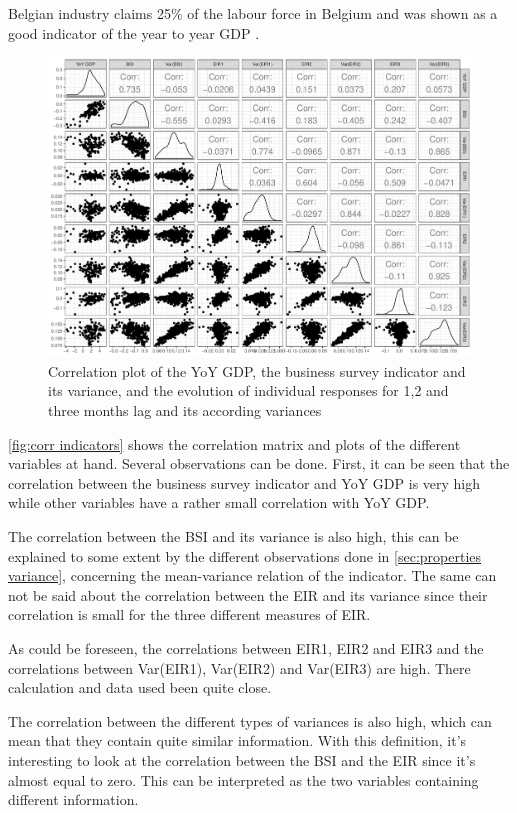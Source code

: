 \documentclass[12pt,a4paper,oneside]{book}
\begin{document}
Belgian industry claims 25\% of the labour force in Belgium and was shown as a good indicator of the year to year GDP
\citep{de_greef_national_2009}.

\begin{figure}[H]
    \centering
    \includegraphics[scale=0.5]{Graphs/corr_indicators.pdf}
    \caption{Correlation plot of the YoY GDP, the business survey indicator and its variance, and the evolution of individual responses for 1,2 and three months lag and its according variances}
    \label{fig:corr indicators}
\end{figure}

\autoref{fig:corr indicators} shows the correlation matrix and plots of the different variables at hand. 
Several observations can be done.
First, it can be seen that the correlation between the business survey indicator and YoY GDP is very high while other variables have a rather small correlation with YoY GDP.

The correlation between the BSI and its variance is also high, this can be explained to some extent by the different observations done in \autoref{sec:properties variance}, concerning the mean-variance relation of the indicator.
The same can not be said about the correlation between the EIR and its variance since their correlation is small for the three different measures of EIR.

As could be foreseen, the correlations between EIR1, EIR2 and EIR3 and the correlations between Var(EIR1), Var(EIR2) and Var(EIR3) are high. There calculation and data used been quite close.

The correlation between the different types of variances is also high, which can mean that they contain quite similar information.
With this definition, it's interesting to look at the correlation between the BSI and the EIR since it's almost equal to zero. This can be interpreted as the two variables containing different information.
\end{document}
